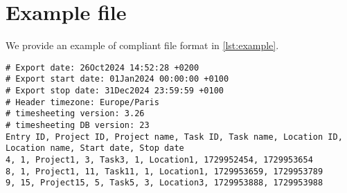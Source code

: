 \section{Example file} \label{sec:example}
We provide an example of compliant file format in \cref{lst:example}.

\begin{minipage}{\linewidth}
\begin{lstlisting}[caption={Compliant exported timesheet file.},
                   label={lst:example}]
# Export date: 26Oct2024 14:52:28 +0200
# Export start date: 01Jan2024 00:00:00 +0100
# Export stop date: 31Dec2024 23:59:59 +0100
# Header timezone: Europe/Paris
# timesheeting version: 3.26
# timesheeting DB version: 23
Entry ID, Project ID, Project name, Task ID, Task name, Location ID, Location name, Start date, Stop date
4, 1, Project1, 3, Task3, 1, Location1, 1729952454, 1729953654
8, 1, Project1, 11, Task11, 1, Location1, 1729953659, 1729953789
9, 15, Project15, 5, Task5, 3, Location3, 1729953888, 1729953988
\end{lstlisting} \end{minipage}
